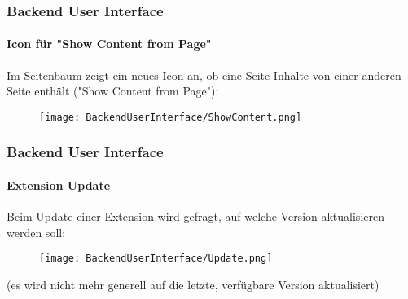 \begin{frame}[fragile]
	\frametitle{Backend User Interface}
	\framesubtitle{Icon für "Show Content from Page"}

	Im Seitenbaum zeigt ein neues Icon an, ob eine Seite Inhalte von einer anderen
	Seite enthält ("Show Content from Page"):

	\begin{figure}
		\texttt{[image: BackendUserInterface/ShowContent.png]}
	\end{figure}

\end{frame}

\begin{frame}[fragile]
	\frametitle{Backend User Interface}
	\framesubtitle{Extension Update}

	Beim Update einer Extension wird gefragt, auf welche Version aktualisieren werden soll:

	\begin{figure}
		\texttt{[image: BackendUserInterface/Update.png]}
	\end{figure}

	\small(es wird nicht mehr generell auf die letzte, verfügbare Version aktualisiert)\normalsize

\end{frame}

